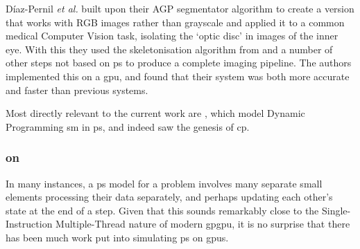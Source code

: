 Díaz-Pernil \textit{et al.} \cite{Diaz-Pernil2016} built upon their AGP segmentator algorithm to create a version that works with RGB images rather than grayscale and applied it to a common medical Computer Vision task, isolating the `optic disc' in images of the inner eye.  With this they used the skeletonisation algorithm from \cite{Diaz-Pernil2013a} and a number of other steps not based on \gls{ps} to produce a complete imaging pipeline.  The authors implemented this on a \gls{gpu}, and found that their system was both more accurate and faster than previous systems.


Most directly relevant to the current work are \cite{GimelFarb2013a,Gimelfarb2011,Nicolescu2014b}, which model Dynamic Programming \gls{sm} in \gls{ps}, and indeed saw the genesis of \gls{cp}.  

\subsubsection{ on }
In many instances, a \gls{ps} model for a problem involves many separate small elements processing their data separately, and perhaps updating each other's state at the end of a step.  Given that this sounds remarkably close to the Single-Instruction Multiple-Thread \cite[Ch. 4.4.1]{Hennessy2012} nature of modern \gls{gpgpu}, it is no surprise that there has been much work put into simulating \gls{ps} on \glspl{gpu}.


